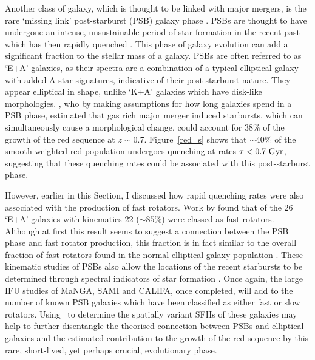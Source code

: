 Another class of galaxy, which is thought to be linked with major mergers, is the rare \citep[$<1\%$;][]{Wong12, wild16} `missing link' post-starburst (PSB) galaxy phase \citep{zabludoff96, blake04, goto05b, yang08, pawlik16}. PSBs are thought to have undergone an intense, unsustainable period of star formation in the recent past which has then rapidly quenched \citep{dressler83, abraham96b, poggianti99, goto03, goto05b, goto07}. This phase of galaxy evolution can add a significant fraction \citep[$\sim10\%$;][]{wild10} to the stellar mass of a galaxy. PSBs are often referred to as `E+A' galaxies, as their spectra are a combination of a typical elliptical galaxy with added A star signatures, indicative of their post starburst nature. They appear elliptical in shape, unlike `K+A' galaxies which have disk-like morphologies.  \citet{Wild09}, who by making assumptions for how long galaxies spend in a PSB phase, estimated that gas rich major merger induced starbursts, which can simultaneously cause a morphological change, could account for $38\%$ of the growth of the red sequence at $z\sim0.7$. Figure~\ref{red_s} shows that $\sim40\%$ of the smooth weighted red population undergoes quenching at rates $\tau < 0.7~\rm{Gyr}$, suggesting that these quenching rates could be associated with this post-starburst phase. 

However, earlier in this Section, I discussed how rapid quenching rates were also associated with the production of fast rotators. Work by \cite{pracy13} found that of the 26 `E+A' galaxies with kinematics 22 ($\sim85\%$) were classed as fast rotators. Although at first this result seems to suggest a connection between the PSB phase and fast rotator production, this fraction is in fact similar to the overall fraction of fast rotators found in the normal elliptical galaxy population \citep{emsellem11, stott16}. These kinematic studies of PSBs also allow the locations of the recent starbursts to be determined through spectral indicators of star formation \citep[such as $H\alpha$;][]{kennicutt94}. Once again, the large IFU studies of MaNGA, SAMI and CALIFA, once completed, will add to the number of known PSB galaxies which have been classified as either fast or slow rotators. Using \starpy\ to determine the spatially variant SFHs of these galaxies may help to further disentangle the theorised connection between PSBs and elliptical galaxies and the estimated contribution to the growth of the red sequence by this rare, short-lived, yet perhaps crucial, evolutionary phase. 

